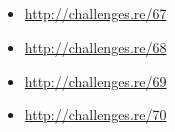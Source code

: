 \subsection{\Exercises}

\begin{itemize}
	\item \url{http://challenges.re/67}
	\item \url{http://challenges.re/68}
	\item \url{http://challenges.re/69}
	\item \url{http://challenges.re/70}
\end{itemize}

